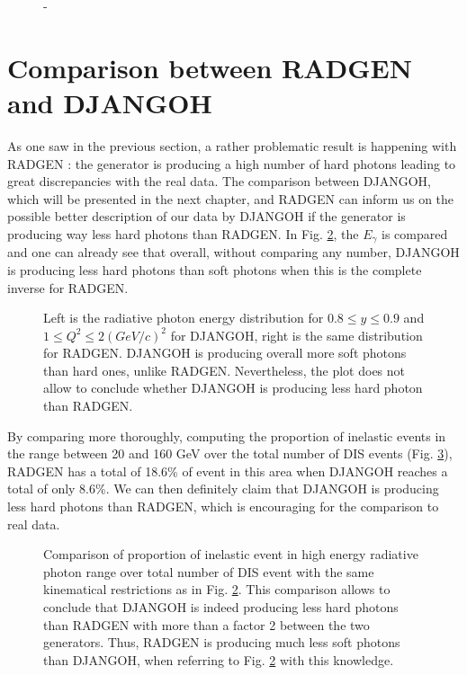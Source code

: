 \begin{figure}[htb!]
\centerline{}
\caption{-}\label{fig:ph_pl}
\end{figure}


\section{Comparison between RADGEN and DJANGOH}

As one saw in the previous section, a rather problematic result is happening with RADGEN : the generator is
producing a high number of hard photons leading to great discrepancies with the real data. The comparison between
DJANGOH, which will be presented in the next chapter, and RADGEN can inform us on the possible better description
of our data by DJANGOH if the generator is producing way less hard photons than RADGEN. In Fig. \ref{fig:DJRAD},
the $E_{\gamma}$ is compared and one can already see that overall, without comparing any number, DJANGOH is producing
less hard photons than soft photons when this is the complete inverse for RADGEN.

\begin{figure}[htb]
\centerline{}
\caption{Left is the radiative photon energy distribution for $0.8 \leq y \leq 0.9$ and $1 \leq Q^2 \leq 2 (GeV/c)^2$ for DJANGOH, right is the same distribution for RADGEN.
DJANGOH is producing overall more soft photons than hard ones, unlike RADGEN. Nevertheless, the plot does not allow
to conclude whether DJANGOH is producing less hard photon than RADGEN.}\label{fig:DJRAD}
\end{figure}

By comparing more thoroughly, computing the proportion of inelastic events in the range between 20 and 160 GeV
over the total number of DIS events (Fig. \ref{fig:tabDJRAD}), RADGEN has a total of 18.6\% of event in this
area when DJANGOH reaches a total of only 8.6\%. We can then definitely claim that DJANGOH is producing less
hard photons than RADGEN, which is encouraging for the comparison to real data.

\begin{figure}[htb]
\centerline{}
\caption{Comparison of proportion of inelastic event in high energy radiative photon range over total number
of DIS event with the same kinematical restrictions as in Fig. \ref{fig:DJRAD}. This comparison allows to conclude that DJANGOH is indeed producing less hard photons than
RADGEN with more than a factor 2 between the two generators. Thus, RADGEN is producing much less
soft photons than DJANGOH, when referring to Fig. \ref{fig:DJRAD} with this knowledge.}\label{fig:tabDJRAD}
\end{figure}
